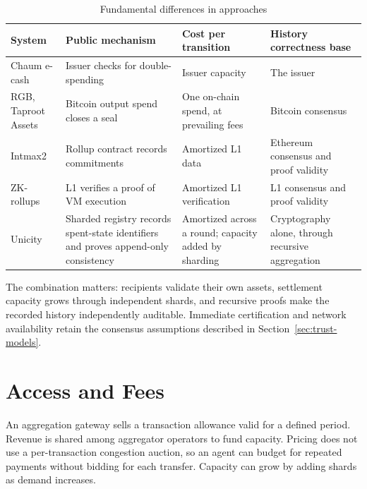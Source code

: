\begin{table}[ht]
    \centering
    \caption{Fundamental differences in approaches}
    \label{tab:sota}
    \small
    \begin{tabular}{@{}>{\raggedright\arraybackslash}p{2.9cm}>{\raggedright\arraybackslash}p{3.5cm}>{\raggedright\arraybackslash}p{3.3cm}>{\raggedright\arraybackslash}p{4.2cm}@{}}
        \toprule
        \textbf{System} &
        \textbf{Public mechanism} &
        \textbf{Cost per transition} &
        \textbf{History correctness base} \\
        \midrule
        Chaum e-cash & Issuer checks for double-spending & Issuer capacity & The issuer \\
        \addlinespace
        RGB, Taproot Assets & Bitcoin output spend closes a seal & One on-chain spend, at prevailing fees & Bitcoin consensus \\
        \addlinespace
        Intmax2 & Rollup contract records commitments & Amortized L1 data & Ethereum consensus and proof validity \\
        \addlinespace
        ZK-rollups & L1 verifies a proof of VM execution & Amortized L1 verification & L1 consensus and proof validity \\
        \addlinespace
        Unicity & Sharded registry records spent-state identifiers and proves append-only consistency & Amortized across a round; capacity added by sharding & Cryptography alone, through recursive aggregation \\
        \bottomrule
    \end{tabular}
\end{table}

The combination matters: recipients validate their own assets, settlement capacity grows through independent shards, and recursive proofs make the recorded history independently auditable. Immediate certification and network availability retain the consensus assumptions described in Section~\ref{sec:trust-models}.

\section{Access and Fees}\label{sec:fees}

An aggregation gateway sells a transaction allowance valid for a defined period. Revenue is shared among aggregator operators to fund capacity. Pricing does not use a per-transaction congestion auction, so an agent can budget for repeated payments without bidding for each transfer. Capacity can grow by adding shards as demand increases.

